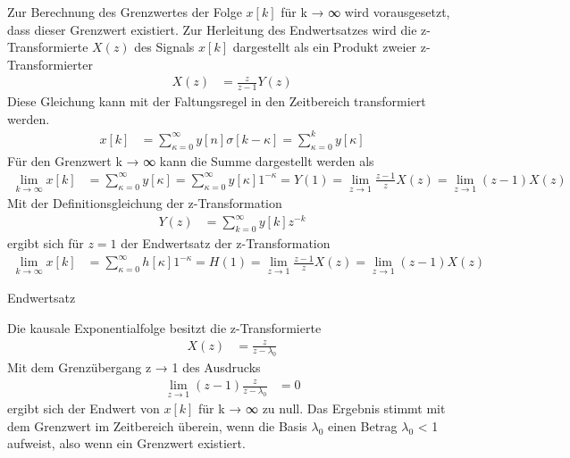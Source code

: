 Zur Berechnung des Grenzwertes der Folge \(x[k]\) für k → ∞ wird vorausgesetzt, dass dieser Grenzwert existiert. Zur Herleitung des Endwertsatzes wird die z-Transformierte \(X(z)\) des Signals \(x[k]\) dargestellt als ein Produkt zweier z-Transformierter
\begin{align}
X(z) &= \frac{z}{z - 1}  Y(z) \label{eq:5.75}
\end{align}
Diese Gleichung kann mit der Faltungsregel in den Zeitbereich transformiert werden.
\begin{align}
x[ k] &= \sum\limits_{\kappa = 0}^{\infty}{y[ n]  \sigma[ k - \kappa]} = \sum\limits_{\kappa = 0}^{k}{y[\kappa]} \label{eq:5.76}
\end{align}
Für den Grenzwert k → ∞ kann die Summe dargestellt werden als
\begin{align}
\lim_{k \rightarrow \infty}x[ k] &= \sum\limits_{\kappa = 0}^{\infty}{y[\kappa]} = \sum\limits_{\kappa = 0}^{\infty}{y[\kappa]}  1^{- \kappa} = Y(1) = \lim_{z \rightarrow 1}\frac{z - 1}{z}  X(z) = \lim_{z \rightarrow 1}(z - 1)  X(z) \label{eq:5.77}
\end{align}
Mit der Definitionsgleichung der z-Transformation
\begin{align}
Y(z) &= \sum\limits_{k = 0}^{\infty}{y[ k]  z^{- k}} \label{eq:5.78}
\end{align}
ergibt sich für \(z = 1\) der Endwertsatz der z-Transformation
\begin{align}
\lim_{k \rightarrow \infty}x[ k] &= \sum\limits_{\kappa = 0}^{\infty}{h[\kappa]}  1^{- \kappa} = H(1) = \lim_{z \rightarrow 1}\frac{z - 1}{z}  X(z) = \lim_{z \rightarrow 1}(z - 1)  X(z) \label{eq:5.79}
\end{align}
\begin{example}{Endwertsatz}
\label{example:beispiel-endwertsatz}

Die kausale Exponentialfolge besitzt die z-Transformierte
\begin{align*}
X(z) &= \frac{z}{z - \lambda_{0}} 
\end{align*}
Mit dem Grenzübergang z → 1 des Ausdrucks
\begin{align*}
\lim_{z \rightarrow 1}(z - 1)  \frac{z}{z - \lambda_{0}} &= 0 
\end{align*}
ergibt sich der Endwert von \(x[k]\) für k → ∞ zu null. Das Ergebnis stimmt mit dem Grenzwert im Zeitbereich überein, wenn die Basis \(λ_{0}\) einen Betrag \textbar \(λ_{0}\)\textbar{} \textless{} 1 aufweist, also wenn ein Grenzwert existiert.

\end{example}

